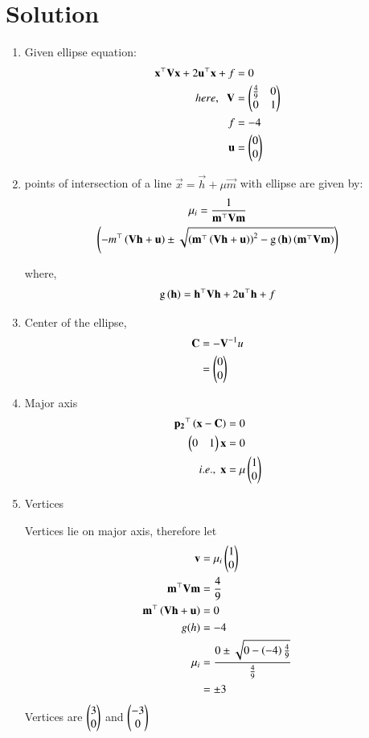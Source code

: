 \documentclass[journal,12pt,twocolumn]{IEEEtran}
\begin{document}
\section{Solution}
\begin{enumerate}

	\item Given ellipse equation:
\begin{align}
	\mathbf{x}^{\top} \mathbf{V} \mathbf{x} + 2 \mathbf{u}^{\top}\mathbf{x} +f &= 0\\
	here,\;\;
	\mathbf{V} &= \begin{pmatrix}\frac{4}{9} & 0\\0&1\end{pmatrix}\\
	f &= -4\\
	\mathbf{u} &= \begin{pmatrix}0\\0\end{pmatrix}
\end{align}

\item points of intersection of a line $\vec{x} = \vec{h}+ \mu\vec{m}$ with ellipse are given by:
\begin{multline}
	\mu_i = \frac{1}{\mathbf{m}^{\top}\mathbf{V}\mathbf{m}} \\ \left(   -m^{\top}\left(\mathbf{V}\mathbf{h}+\mathbf{u}\right)  \pm \sqrt{\left(\mathbf{m}^{\top}\left(\mathbf{V}\mathbf{h}+\mathbf{u}\right)\right)^2 - \text{g}\left(\mathbf{h}\right)\left(\mathbf{m}^{\top}\mathbf{V}\mathbf{m}\right)} \right) 
\end{multline}

where,
\begin{align}
	\text{g}\left(\mathbf{h}\right) = \mathbf{h}^{\top}\mathbf{V}\mathbf{h} + 2\mathbf{u}^{\top}\mathbf{h} +f
\end{align}


\item Center of the ellipse,
	\begin{align}
		\mathbf{C} &= -\mathbf{V}^{-1}u\\
			&= \begin{pmatrix}0\\0\end{pmatrix}
	\end{align}

\item Major axis
	\begin{align}
		\mathbf{p_2}^{\top}\left(\mathbf{x} - \mathbf{C}\right) &=0\\
		\begin{pmatrix}0&1\end{pmatrix}\mathbf{x} &= 0\\
		i.e., \; \mathbf{x} &= \mu \begin{pmatrix}1\\0\end{pmatrix}
	\end{align}
\item Vertices

Vertices lie on major axis, therefore let
\begin{align}
	\mathbf{v} &= {\mu}_i \begin{pmatrix}1\\0\end{pmatrix}\\
	\mathbf{m}^{\top}\mathbf{V}\mathbf{m} &= \frac{4}{9}\\
	\mathbf{m}^{\top}\left(\mathbf{V}\mathbf{h}+\mathbf{u}\right) &= 0\\
	g(h) &= -4\\
	{\mu}_i &= \frac{0 \pm \sqrt{0 - \left(-4\right)\frac{4}{9}}}{\frac{4}{9}}\\
		&= \pm 3
\end{align}
Vertices are $\begin{pmatrix}3\\0\end{pmatrix}$ and $\begin{pmatrix}-3\\0\end{pmatrix}$ 


\end{enumerate}
\end{document}
